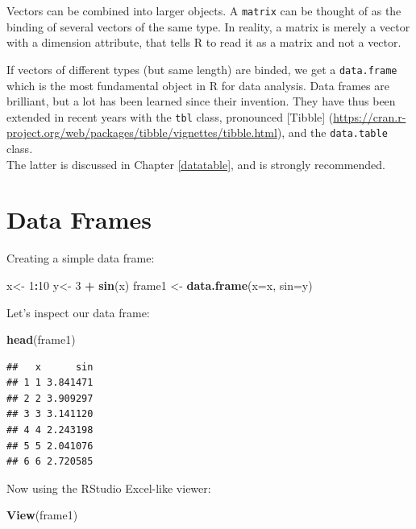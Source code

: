 \documentclass[]{book}
\newenvironment{Shaded}{\begin{snugshade}}{\end{snugshade}}
\newcommand{\DataTypeTok}[1]{\textcolor[rgb]{0.13,0.29,0.53}{#1}}
\newcommand{\DecValTok}[1]{\textcolor[rgb]{0.00,0.00,0.81}{#1}}
\newcommand{\KeywordTok}[1]{\textcolor[rgb]{0.13,0.29,0.53}{\textbf{#1}}}
\newcommand{\NormalTok}[1]{#1}
\newcommand{\OperatorTok}[1]{\textcolor[rgb]{0.81,0.36,0.00}{\textbf{#1}}}
\newcommand{\StringTok}[1]{\textcolor[rgb]{0.31,0.60,0.02}{#1}}
\theoremstyle{definition}
\theoremstyle{definition}
\theoremstyle{definition}
\theoremstyle{remark}
\begin{document}
Vectors can be combined into larger objects.
A \texttt{matrix} can be thought of as the binding of several vectors of the same type.
In reality, a matrix is merely a vector with a dimension attribute, that tells R to read it as a matrix and not a vector.

If vectors of different types (but same length) are binded, we get a \texttt{data.frame} which is the most fundamental object in R for data analysis.
Data frames are brilliant, but a lot has been learned since their invention.
They have thus been extended in recent years with the \texttt{tbl} class, pronounced {[}Tibble{]} (\url{https://cran.r-project.org/web/packages/tibble/vignettes/tibble.html}), and the \texttt{data.table} class.\\
The latter is discussed in Chapter \ref{datatable}, and is strongly recommended.

\hypertarget{data-frames}{%
\section{Data Frames}\label{data-frames}}

Creating a simple data frame:

\begin{Shaded}
\begin{Highlighting}[]
\NormalTok{x<-}\StringTok{ }\DecValTok{1}\OperatorTok{:}\DecValTok{10}
\NormalTok{y<-}\StringTok{ }\DecValTok{3} \OperatorTok{+}\StringTok{ }\KeywordTok{sin}\NormalTok{(x) }
\NormalTok{frame1 <-}\StringTok{ }\KeywordTok{data.frame}\NormalTok{(}\DataTypeTok{x=}\NormalTok{x, }\DataTypeTok{sin=}\NormalTok{y)    }
\end{Highlighting}
\end{Shaded}

Let's inspect our data frame:

\begin{Shaded}
\begin{Highlighting}[]
\KeywordTok{head}\NormalTok{(frame1)}
\end{Highlighting}
\end{Shaded}

\begin{verbatim}
##   x      sin
## 1 1 3.841471
## 2 2 3.909297
## 3 3 3.141120
## 4 4 2.243198
## 5 5 2.041076
## 6 6 2.720585
\end{verbatim}

Now using the RStudio Excel-like viewer:

\begin{Shaded}
\begin{Highlighting}[]
\KeywordTok{View}\NormalTok{(frame1) }
\end{Highlighting}
\end{Shaded}
\end{document}

